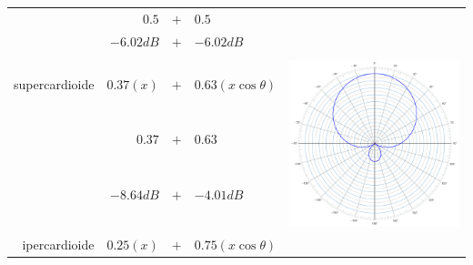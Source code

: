 \begin{table}[ht]
\begin{center}
\begin{tabular}{rrcll}
                & $0.5$        & $+$ & $0.5$                & \\
                & $-6.02dB$    & $+$ & $-6.02dB$            & \\ %
& \\
\hline
supercardioide  & $0.37(x)$    & $+$ & $0.63(x\cos\theta)$  &
 \multirow{4}{*}{\begin{minipage}{.25\textwidth}\includegraphics[width=\linewidth]{CAPITOLI/_TIKZ/POLAR/supercardioid}\end{minipage}} \\
                & $0.37$       & $+$ & $0.63$               & \\
                & $-8.64dB$    & $+$ & $-4.01dB$            & \\ %
& \\
\hline
ipercardioide   & $0.25(x)$    & $+$ & $0.75(x\cos\theta)$  &

\end{tabular}
\end{center}
\end{table}
